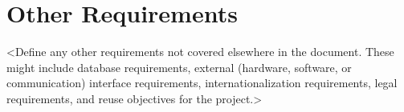 \section{Other Requirements}
<Define any other requirements not covered elsewhere in the document. These might include database requirements, external (hardware, software, or communication) interface requirements, internationalization requirements, legal requirements, and reuse objectives for the project.>


